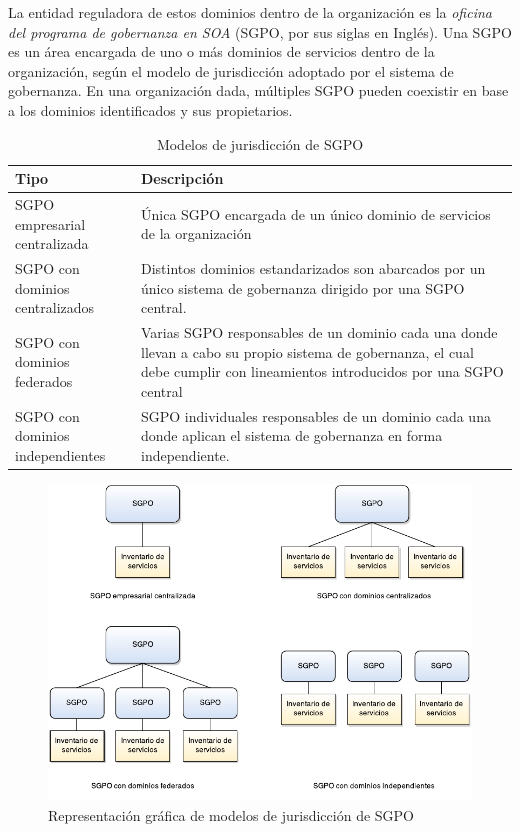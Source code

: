 \documentclass[11pt]{article}
\begin{document}
			La entidad reguladora de estos dominios dentro de la organización es la \emph{oficina del programa de gobernanza en SOA} (SGPO, por sus siglas en Inglés). Una SGPO es un área encargada de uno o más dominios de servicios dentro de la organización, según el modelo de jurisdicción adoptado por el sistema de gobernanza. En una organización dada, múltiples SGPO pueden coexistir en base a los dominios identificados y sus propietarios.

			\begin{table}[h]
				\begin{tabular}{p{0.25\linewidth} | p{0.75\linewidth}}
					\textbf{Tipo} & \textbf{Descripción} \\
					\hline
					SGPO empresarial centralizada & Única SGPO encargada de un único dominio de servicios de la organización\\
					\hline
					SGPO con dominios centralizados & Distintos dominios estandarizados son abarcados por un único sistema de gobernanza dirigido por una SGPO central.\\
					\hline
					SGPO con dominios federados & Varias SGPO responsables de un dominio cada una donde llevan a cabo su propio sistema de gobernanza, el cual debe cumplir con lineamientos introducidos por una SGPO central\\
					\hline
					SGPO con dominios independientes & SGPO individuales responsables de un dominio cada una donde aplican el sistema de gobernanza en forma independiente.\\
					\hline
				\end{tabular}
				\caption{Modelos de jurisdicción de SGPO}
				\label{tabla:modelos_sgpo}
			\end{table}

			\begin{figure}[h]
				\centering
				\includegraphics[width=\linewidth]{modelos_sgpo}
				\caption{Representación gráfica de modelos de jurisdicción de SGPO}
				\label{imagen:modelos_sgpo}
			\end{figure}
\end{document}
